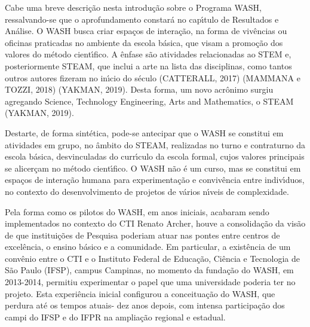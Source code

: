\documentclass[
12pt,		%
openright,	%
twoside,  %
a4paper,			%
chapter=TITLE,		%
english,			%
french,				%
spanish,			%
brazil				%
]{USPSC-classe/USPSC}
\begin{document}
Cabe uma breve descri\c{c}\~ao nesta introdu\c{c}\~ao sobre o Programa WASH, ressalvando-se que o aprofundamento constar\'a no cap\'{\i}tulo de Resultados e An\'alise. O WASH busca criar espa\c{c}os de intera\c{c}\~ao, na forma de  viv\^encias ou oficinas praticadas no ambiente da escola b\'asica, que visam a promo\c{c}\~ao dos valores do m\'etodo cient\'{\i}fico. A \^enfase s\~ao atividades relacionadas ao STEM e, posteriormente STEAM, que inclui a arte na lista das disciplinas, como tantos outros autores fizeram no in\'{\i}cio do s\'eculo  (CATTERALL, 2017) (MAMMANA e TOZZI, 2018)  (YAKMAN, 2019). Desta forma, um novo acr\^onimo surgiu agregando Science, Technology Engineering, Arts and Mathematics, o STEAM  (YAKMAN, 2019).

















Destarte, de forma sint\'etica, pode-se antecipar que o WASH se constitui em atividades em grupo, no \^ambito do STEAM, realizadas no turno e contraturno da escola b\'asica, desvinculadas do curr\'{\i}culo da escola formal, cujos valores principais se alicer\c{c}am no m\'etodo cient\'{\i}fico. O WASH n\~ao \'e um curso, mas se constitui em espa\c{c}os de intera\c{c}\~ao humana para experimenta\c{c}\~ao e conviv\^encia entre indiv\'{\i}duos, no contexto do desenvolvimento de projetos de v\'arios n\'{\i}veis de complexidade.

















Pela forma como os pilotos do WASH, em anos iniciais, acabaram sendo implementados no contexto do CTI Renato Archer, houve a consolida\c{c}\~ao da vis\~ao de que institui\c{c}\~oes de Pesquisa poderiam atuar nas pontes entre centros de excel\^encia, o ensino b\'asico e a comunidade. Em particular, a exist\^encia de um conv\^enio entre o CTI e o Instituto Federal de Educa\c{c}\~ao, Ci\^encia e Tecnologia de S\~ao Paulo (IFSP), campus Campinas, no momento da funda\c{c}\~ao do WASH, em 2013-2014, permitiu experimentar o papel que uma universidade poderia ter no projeto. Esta experi\^encia inicial configurou a conceitua\c{c}\~ao do WASH, que perdura at\'e os tempos atuais- dez anos depois, com intensa participa\c{c}\~ao dos campi do IFSP e do IFPR na amplia\c{c}\~ao regional e estadual.
\end{document}
